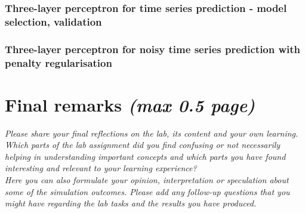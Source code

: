 \documentclass[a4paper]{article}
\begin{document}
\subsubsection{Three-layer perceptron for time series prediction - model selection, validation}

\subsubsection{Three-layer perceptron for noisy time series prediction with penalty regularisation}

\section{Final remarks \normalsize{\textit{(max 0.5 page)}}}
\textit{Please share your final reflections on the lab, its content and your own learning. Which parts of the lab assignment did you find confusing or not necessarily helping in understanding important concepts and which parts you have found interesting and relevant to your learning experience? \\
Here you can also formulate your opinion, interpretation or speculation about some of the simulation outcomes. Please add any follow-up questions that you might have regarding the lab tasks and the results you have produced.}
\end{document}
